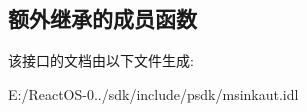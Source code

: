 \subsection*{额外继承的成员函数}


该接口的文档由以下文件生成\+:\begin{DoxyCompactItemize}
\item 
E\+:/\+React\+O\+S-\/0../sdk/include/psdk/msinkaut.\+idl\end{DoxyCompactItemize}
